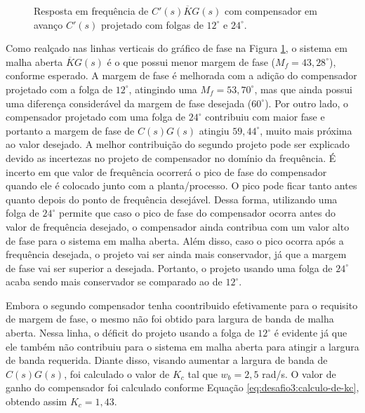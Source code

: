 \begin{figure}[!ht]
    \caption{Resposta em frequência de ${C}'(s)\overline{K}G(s)$ com compensador
    em avanço ${C}'(s)$ projetado com folgas de $12^{\circ}$ e $24^{\circ}$.}
    \vspace{-10pt}
    \hspace{-30pt}
    \label{fig:desafio-3:questao-3-4-malha-aberta}
    \begin{minipage}{\linewidth}
        
    \end{minipage}
\end{figure}

Como realçado nas linhas verticais do gráfico de fase na Figura
\ref{fig:desafio-3:questao-3-4-malha-aberta}, o sistema em malha aberta
$\overline{K}G(s)$ é o que possui menor margem de fase ($M_{f} =
43,28^{\circ}$), conforme esperado. A margem de fase é melhorada com a adição do
compensador projetado com a folga de $12^{\circ}$, atingindo uma $M_{f} =
53,70^{\circ}$, mas que ainda possui uma diferença considerável da margem de
fase desejada ($60^{\circ}$). Por outro lado, o compensador projetado com uma
folga de $24^{\circ}$ contribuiu com maior fase e portanto a margem de fase de
$C(s)G(s)$ atingiu $59,44^{\circ}$, muito mais próxima ao valor desejado. A
melhor contribuição do segundo projeto pode ser explicado devido as incertezas
no projeto de compensador no domínio da frequência. É incerto em que valor de
frequência ocorrerá o pico de fase do compensador quando ele é colocado junto
com a planta/processo. O pico pode ficar tanto antes quanto depois do ponto de
frequência desejável. Dessa forma, utilizando uma folga de $24^{\circ}$ permite
que caso o pico de fase do compensador ocorra antes do valor de frequência
desejado, o compensador ainda contribua com um valor alto de fase para o sistema
em malha aberta. Além disso, caso o pico ocorra após a frequência desejada, o
projeto vai ser ainda mais conservador, já que a margem de fase vai ser superior
a desejada. Portanto, o projeto usando uma folga de $24^{\circ}$ acaba sendo
mais conservador se comparado ao de $12^{\circ}$.

Embora o segundo compensador tenha coontribuido efetivamente para o requisito de
margem de fase, o mesmo não foi obtido para largura de banda de malha aberta.
Nessa linha, o déficit do projeto usando a folga de $12^{\circ}$ é evidente já
que ele também não contribuiu para o sistema em malha aberta para atingir a
largura de banda requerida. Diante disso, visando aumentar a largura de banda de
$C(s)G(s)$, foi calculado o valor de $K_{c}$ tal que $w_{b} = 2,5$ rad/s. O
valor de ganho do compensador foi calculado conforme Equação
\ref{eq:desafio3:calculo-de-kc}, obtendo assim $K_c = 1,43$.

